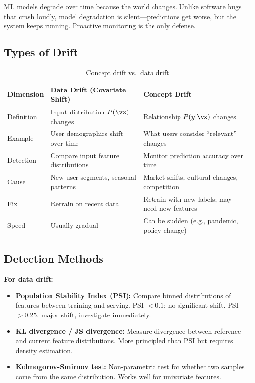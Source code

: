 ML models degrade over time because the world changes. Unlike software bugs that crash loudly, model degradation is silent---predictions get worse, but the system keeps running. Proactive monitoring is the only defense.

\subsection{Types of Drift}

\begin{table}[H]
\centering
\caption{Concept drift vs.\ data drift}
\begin{tabularx}{\textwidth}{lXX}
\toprule
\textbf{Dimension} & \textbf{Data Drift (Covariate Shift)} & \textbf{Concept Drift} \\
\midrule
Definition & Input distribution $P(\vx)$ changes & Relationship $P(y|\vx)$ changes \\
Example & User demographics shift over time & What users consider ``relevant'' changes \\
Detection & Compare input feature distributions & Monitor prediction accuracy over time \\
Cause & New user segments, seasonal patterns & Market shifts, cultural changes, competition \\
Fix & Retrain on recent data & Retrain with new labels; may need new features \\
Speed & Usually gradual & Can be sudden (e.g., pandemic, policy change) \\
\bottomrule
\end{tabularx}
\end{table}

\subsection{Detection Methods}

\textbf{For data drift:}
\begin{itemize}
    \item \textbf{Population Stability Index (PSI):} Compare binned distributions of features between training and serving. PSI $< 0.1$: no significant shift. PSI $> 0.25$: major shift, investigate immediately.
    \item \textbf{KL divergence / JS divergence:} Measure divergence between reference and current feature distributions. More principled than PSI but requires density estimation.
    \item \textbf{Kolmogorov-Smirnov test:} Non-parametric test for whether two samples come from the same distribution. Works well for univariate features.
\end{itemize}


